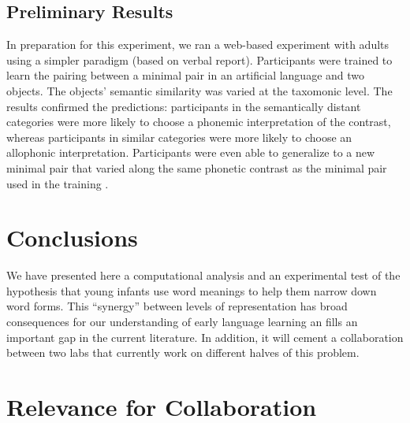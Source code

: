 \documentclass[12pt]{article}
\begin{document}

\subsection{Preliminary Results}

In preparation for this experiment, we ran a web-based experiment with adults using a simpler paradigm (based on verbal report).  Participants were trained to learn the pairing between a minimal pair in an artificial language and two objects. The objects' semantic similarity was varied at the taxomonic level. The results confirmed the predictions: participants in the semantically distant categories were more likely to choose a phonemic interpretation of the contrast, whereas participants in similar categories were more likely to choose an allophonic interpretation. Participants were even able to generalize to a new minimal pair that varied along the same phonetic contrast as the minimal pair used in the training \cite{fourtassisumitted}.

\section{Conclusions}

We have presented here a computational analysis and an experimental test of the hypothesis that young infants use word meanings to help them narrow down word forms. This ``synergy'' between levels of representation has broad consequences for our understanding of early language learning an fills an important gap in the current literature. In addition, it will cement a collaboration between two labs that currently work on different halves of this problem. 




\newpage

\section*{Relevance for Collaboration}
\end{document}
